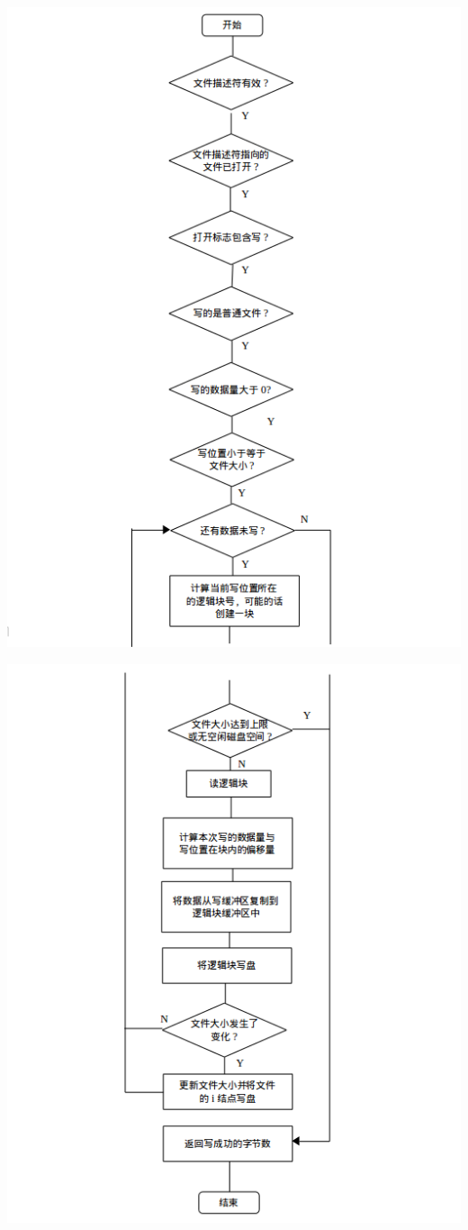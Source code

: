 \documentclass[nofonts]{ctexart}
\begin{document}
\begin{itemize}
  \includegraphics[width=15cm]{./images/./write_1.png}

  \includegraphics[width=15cm]{./images/./write_2.png}
  \end{itemize}
\end{document}
